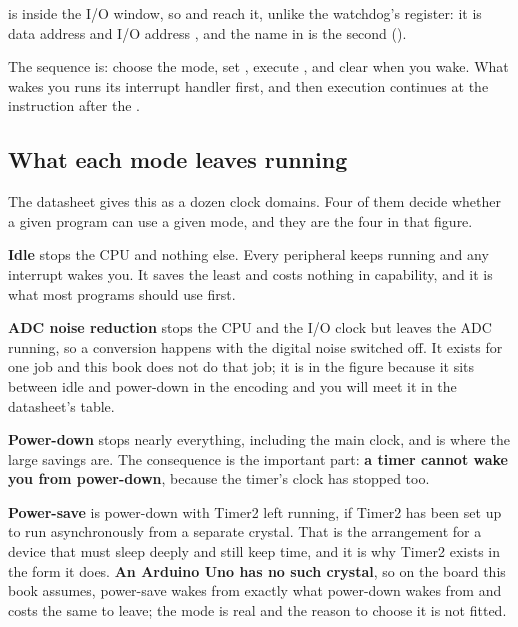  is inside the I/O window, so  and  reach it, unlike the watchdog's
register: it is data address  and I/O address , and the name in
 is the second ().

The sequence is: choose the mode, set , execute , and clear  when you
wake. What wakes you runs its interrupt handler first, and then execution continues at the
instruction after the .

\subsection{What each mode leaves running}
\label{c6:sec:running}


The datasheet gives this as a dozen clock domains. Four of them decide whether a given program can
use a given mode, and they are the four in that figure.

\textbf{Idle} stops the CPU and nothing else. Every peripheral keeps running and any interrupt
wakes you. It saves the least and costs nothing in capability, and it is what most programs should
use first.

\textbf{ADC noise reduction} stops the CPU and the I/O clock but leaves the ADC running, so a
conversion happens with the digital noise switched off. It exists for one job and this book does
not do that job; it is in the figure because it sits between idle and power-down in the
 encoding and you will meet it in the datasheet's table.

\textbf{Power-down} stops nearly everything, including the main clock, and is where the large
savings are. The consequence is the important part: \textbf{a timer cannot wake you from
power-down}, because the timer's clock has stopped too.

\textbf{Power-save} is power-down with Timer2 left running, if Timer2 has been set up to run
asynchronously from a separate crystal. That is the arrangement for a device that must sleep deeply
and still keep time, and it is why Timer2 exists in the form it does. \textbf{An Arduino Uno has no
such crystal}, so on the board this book assumes, power-save wakes from exactly what power-down
wakes from and costs the same to leave; the mode is real and the reason to choose it is not
fitted.

